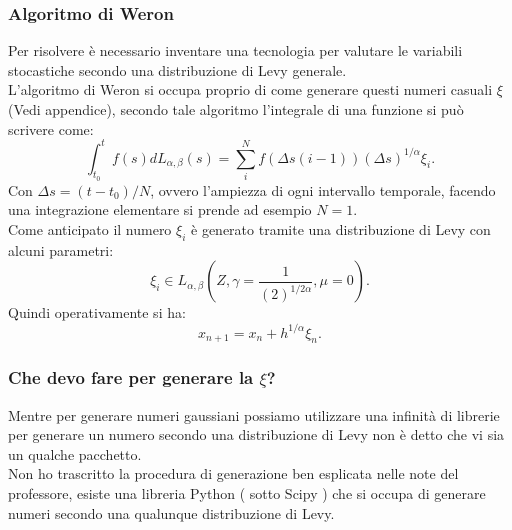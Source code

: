 \subsubsection{Algoritmo di Weron}%
\label{subsub:Algoritmo di Weron}
Per risolvere è necessario inventare una tecnologia per valutare le variabili stocastiche secondo una distribuzione di Levy generale. \\
L'algoritmo di Weron si occupa proprio di come generare questi numeri casuali $\xi$ (Vedi appendice), secondo tale algoritmo l'integrale di una funzione si può scrivere come:
\[
    \int_{t_0}^{t} f(s) dL_{\alpha,\beta  }(s) = \sum_{i}^{N} f(\Delta s(i-1)) \left(\Delta s\right)^{1 /\alpha}\xi_i
.\] 
Con $\Delta s = (t-t_0) /N$, ovvero l'ampiezza di ogni intervallo temporale, facendo una integrazione elementare si prende ad esempio $N=1$.\\
Come anticipato il numero $\xi_i$ è generato tramite una distribuzione di Levy con alcuni parametri:
\[
    \xi_i \in L_{\alpha,\beta  }\left(Z,\gamma =\frac{1}{\left(2\right)^{1 /2\alpha}}, \mu =0\right)
.\] 
Quindi operativamente si ha:
\[
    x_{n+1} = x_n + h ^{1 /\alpha}\xi_n
.\] 
\subsubsection{Che devo fare per generare la $\xi$?}%
Mentre per generare numeri gaussiani possiamo utilizzare una infinità di librerie per generare un numero secondo una distribuzione di Levy non è detto che vi sia un qualche pacchetto. \\
Non ho trascritto la procedura di generazione ben esplicata nelle note del professore, esiste una libreria Python ( sotto Scipy ) che si occupa di generare numeri secondo una qualunque distribuzione di Levy.
\clearpage
